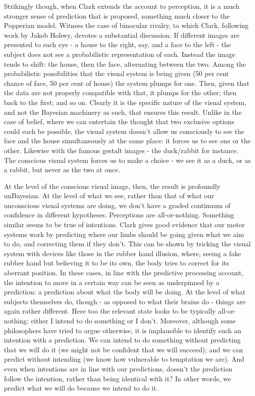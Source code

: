 Strikingly though, when Clark extends the account to perception, it is a much stronger sense of prediction that is proposed, something much closer to the Popperian model. Witness the case of binocular rivalry, to which Clark, following work by Jakob Hohwy, devotes a substantial discussion. If different images are presented to each eye - a house to the right, say, and a face to the left - the subject does not see a probabilistic representation of each. Instead the image tends to shift: the house, then the face, alternating between the two. Among the probabilistic possibilities that the visual system is being given (50 per cent chance of face, 50 per cent of house) the system plumps for one. Then, given that the data are not properly compatible with that, it plumps for the other; then back to the first; and so on. Clearly it is the specific nature of the visual system, and not the Bayesian machinery as such, that ensures this result. Unlike in the case of belief, where we can entertain the thought that two exclusive options could each be possible, the visual system doesn't allow us consciously to see the face and the house simultaneously at the same place: it forces us to see one or the other. Likewise with the famous gestalt images - the duck\slash rabbit for instance. The conscious visual system forces us to make a choice - we see it as a duck, or as a rabbit, but never as the two at once.

At the level of the conscious visual image, then, the result is profoundly unBayesian. At the level of what we see, rather than that of what our unconscious visual systems are doing, we don't have a graded continuum of confidence in different hypotheses. Perceptions are all-or-nothing. Something similar seems to be true of intentions. Clark gives good evidence that our motor systems work by predicting where our limbs should be going given what we aim to do, and correcting them if they don't. This can be shown by tricking the visual system with devices like those in the rubber hand illusion, where, seeing a fake rubber hand but believing it to be its own, the body tries to correct for its aberrant position. In these cases, in line with the predictive processing account, the intention to move in a certain way can be seen as underpinned by a prediction: a prediction about what the body will be doing. At the level of what subjects themselves do, though - as opposed to what their brains do - things are again rather different. Here too the relevant state looks to be typically all-or-nothing: either I intend to do something or I don't. Moreover, although some philosophers have tried to argue otherwise, it is implausible to identify such an intention with a prediction. We can intend to do something without predicting that we will do it (we might not be confident that we will succeed); and we can predict without intending (we know how vulnerable to temptation we are). And even when intentions are in line with our predictions, doesn't the prediction follow the intention, rather than being identical with it? In other words, we predict what we will do because we intend to do it.

